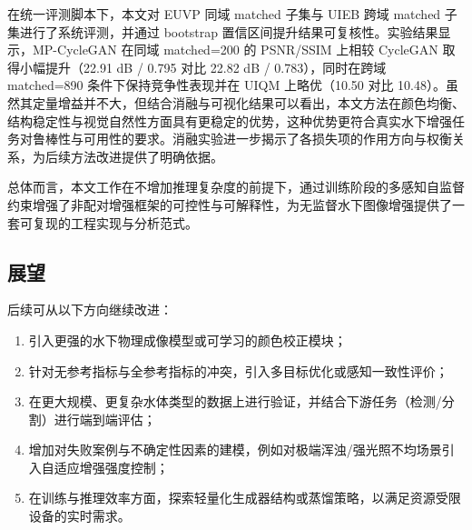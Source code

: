 \documentclass[a4paper,zihao=-4,linespread=1.25]{ctexart}
\begin{document}
在统一评测脚本下，本文对 EUVP 同域 matched 子集与 UIEB 跨域 matched 子集进行了系统评测，并通过 bootstrap 置信区间提升结果可复核性。实验结果显示，MP-CycleGAN 在同域 matched=200 的 PSNR/SSIM 上相较 CycleGAN 取得小幅提升（22.91 dB / 0.795 对比 22.82 dB / 0.783），同时在跨域 matched=890 条件下保持竞争性表现并在 UIQM 上略优（10.50 对比 10.48）。虽然其定量增益并不大，但结合消融与可视化结果可以看出，本文方法在颜色均衡、结构稳定性与视觉自然性方面具有更稳定的优势，这种优势更符合真实水下增强任务对鲁棒性与可用性的要求。消融实验进一步揭示了各损失项的作用方向与权衡关系，为后续方法改进提供了明确依据。

总体而言，本文工作在不增加推理复杂度的前提下，通过训练阶段的多感知自监督约束增强了非配对增强框架的可控性与可解释性，为无监督水下图像增强提供了一套可复现的工程实现与分析范式。

\subsection{展望}
后续可从以下方向继续改进：
\begin{enumerate}
    \item 引入更强的水下物理成像模型或可学习的颜色校正模块；
    \item 针对无参考指标与全参考指标的冲突，引入多目标优化或感知一致性评价；
    \item 在更大规模、更复杂水体类型的数据上进行验证，并结合下游任务（检测/分割）进行端到端评估；
    \item 增加对失败案例与不确定性因素的建模，例如对极端浑浊/强光照不均场景引入自适应增强强度控制；
    \item 在训练与推理效率方面，探索轻量化生成器结构或蒸馏策略，以满足资源受限设备的实时需求。
\end{enumerate}
\end{document}
